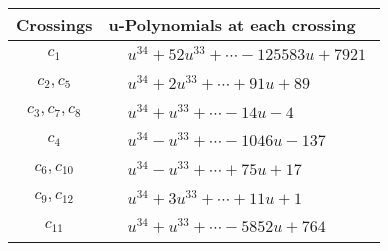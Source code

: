 \documentclass[1p]{elsarticle_modified}
\theoremstyle{definition}
\begin{document}
\begin{tabular}{m{50pt}|m{274pt}}
Crossings & \hspace{64pt}u-Polynomials at each crossing \\
\hline $$\begin{aligned}c_{1}\end{aligned}$$&$\begin{aligned}
&u^{34}+52 u^{33}+\cdots-125583 u+7921
\end{aligned}$\\
\hline $$\begin{aligned}c_{2},c_{5}\end{aligned}$$&$\begin{aligned}
&u^{34}+2 u^{33}+\cdots+91 u+89
\end{aligned}$\\
\hline $$\begin{aligned}c_{3},c_{7},c_{8}\end{aligned}$$&$\begin{aligned}
&u^{34}+u^{33}+\cdots-14 u-4
\end{aligned}$\\
\hline $$\begin{aligned}c_{4}\end{aligned}$$&$\begin{aligned}
&u^{34}- u^{33}+\cdots-1046 u-137
\end{aligned}$\\
\hline $$\begin{aligned}c_{6},c_{10}\end{aligned}$$&$\begin{aligned}
&u^{34}- u^{33}+\cdots+75 u+17
\end{aligned}$\\
\hline $$\begin{aligned}c_{9},c_{12}\end{aligned}$$&$\begin{aligned}
&u^{34}+3 u^{33}+\cdots+11 u+1
\end{aligned}$\\
\hline $$\begin{aligned}c_{11}\end{aligned}$$&$\begin{aligned}
&u^{34}+u^{33}+\cdots-5852 u+764
\end{aligned}$\\
\hline
\end{tabular}\\~\\
\newpage\renewcommand{\arraystretch}{1}
\end{document}
